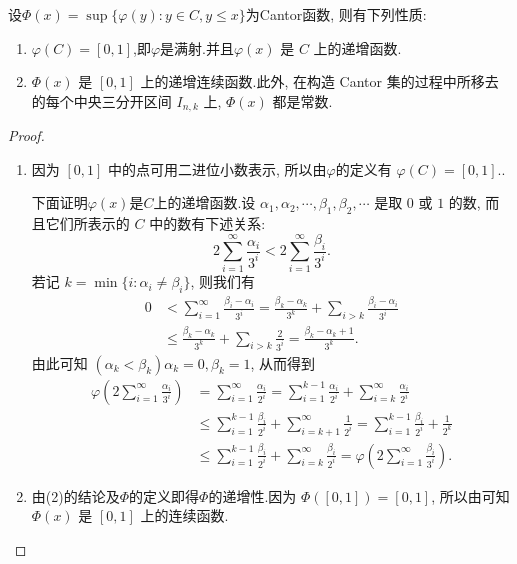 \documentclass[../../main.tex]{subfiles}
\begin{document}
\begin{theorem}[Cantor函数的性质]\label{theorem:Cantor函数的性质}
设$\varPhi(x)=\sup\{\varphi(y):y\in C,y\leqslant x\}$为Cantor函数, 则有下列性质:
\begin{enumerate}[(1)]
\item \(\varphi(C)=[0,1]\),即$\varphi$是满射.并且\(\varphi(x)\) 是 \(C\) 上的递增函数.

\item \(\varPhi(x)\) 是 \([0,1]\) 上的递增连续函数.此外, 在构造 Cantor 集的过程中所移去的每个中央三分开区间 \(I_{n,k}\) 上, \(\varPhi(x)\) 都是常数. 
\end{enumerate}
\end{theorem}
\begin{proof}
\begin{enumerate}[(1)]
\item 因为 \([0,1]\) 中的点可用二进位小数表示, 所以由$\varphi$的定义有 \(\varphi(C)=[0,1]\)..

下面证明$\varphi(x)$是$C$上的递增函数.设 \(\alpha_1,\alpha_2,\cdots,\beta_1,\beta_2,\cdots\) 是取 \(0\) 或 \(1\) 的数, 而且它们所表示的 \(C\) 中的数有下述关系:
\[
2\sum_{i = 1}^{\infty}\frac{\alpha_i}{3^i}<2\sum_{i = 1}^{\infty}\frac{\beta_i}{3^i}.
\]
若记 \(k = \min\{i:\alpha_i\neq\beta_i\}\), 则我们有
\begin{align*}
0&<\sum_{i = 1}^{\infty}\frac{\beta_i - \alpha_i}{3^i}=\frac{\beta_k - \alpha_k}{3^k}+\sum_{i > k}\frac{\beta_i - \alpha_i}{3^i}\\
&\leqslant\frac{\beta_k - \alpha_k}{3^k}+\sum_{i > k}\frac{2}{3^i}=\frac{\beta_k - \alpha_k + 1}{3^k}.
\end{align*}
由此可知 \((\alpha_k<\beta_k)\alpha_k = 0,\beta_k = 1\), 从而得到
\begin{align*}
\varphi\left(2\sum_{i = 1}^{\infty}\frac{\alpha_i}{3^i}\right)&=\sum_{i = 1}^{\infty}\frac{\alpha_i}{2^i}=\sum_{i = 1}^{k - 1}\frac{\alpha_i}{2^i}+\sum_{i = k}^{\infty}\frac{\alpha_i}{2^i}\\
&\leqslant\sum_{i = 1}^{k - 1}\frac{\beta_i}{2^i}+\sum_{i = k + 1}^{\infty}\frac{1}{2^i}=\sum_{i = 1}^{k - 1}\frac{\beta_i}{2^i}+\frac{1}{2^k}\\
&\leqslant\sum_{i = 1}^{k - 1}\frac{\beta_i}{2^i}+\sum_{i = k}^{\infty}\frac{\beta_i}{2^i}=\varphi\left(2\sum_{i = 1}^{\infty}\frac{\beta_i}{3^i}\right).
\end{align*}

\item 由(2)的结论及$\varPhi$的定义即得$\varPhi$的递增性.因为 \(\varPhi([0,1]) = [0,1]\), 所以由可知\(\varPhi(x)\) 是 \([0,1]\) 上的连续函数. 
\end{enumerate}
\end{proof}
\end{document}
